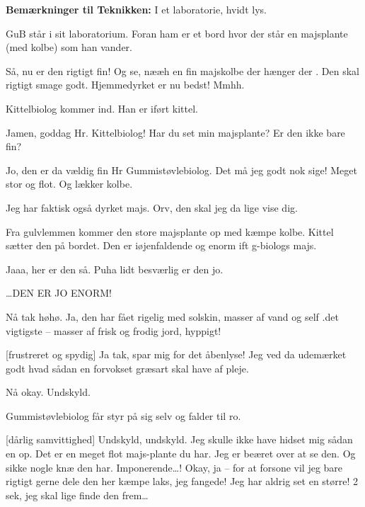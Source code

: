 \documentclass[a4paper,12pt]{article}
\begin{document}
\begin{sketch}

\textbf{Bemærkninger til Teknikken:} I et laboratorie, hvidt lys.





\scene GuB står i sit laboratorium. Foran ham er et bord hvor der står en majsplante (med kolbe) som han vander.

Så, nu er den rigtigt fin! Og se, nææh en fin majskolbe der hænger der . Den skal rigtigt smage godt. Hjemmedyrket er nu bedst! Mmhh.


\scene Kittelbiolog kommer ind. Han er iført kittel.

Jamen, goddag Hr. Kittelbiolog! Har du set min majsplante? Er den ikke bare fin?

Jo, den er da vældig fin Hr Gummistøvlebiolog. Det må jeg godt nok sige! Meget stor og flot. Og lækker kolbe.


Jeg har faktisk også dyrket majs. Orv, den skal jeg da lige vise dig.

\scene Fra gulvlemmen kommer den store majsplante op med kæmpe kolbe. Kittel sætter den på bordet. Den er iøjenfaldende og enorm ift g-biologs majs.

Jaaa, her er den så. Puha lidt besværlig er den jo.

\ldots DEN ER JO ENORM!


Nå tak høhø. Ja, den har fået rigelig med solskin, masser af vand og self .det vigtigste – masser af frisk og frodig jord, hyppigt!

[frustreret og spydig] Ja tak, spar mig for det åbenlyse! Jeg ved da udemærket godt hvad sådan en forvokset græsart skal have af pleje. 

Nå okay. Undskyld.

\scene Gummistøvlebiolog får styr på sig selv og falder til ro.

[dårlig samvittighed] Undskyld, undskyld. Jeg skulle ikke have hidset mig sådan en op. Det er en meget flot majs-plante du har. Jeg er beæret over at se den. Og sikke nogle knæ den har. Imponerende…! Okay, ja – for at forsone vil jeg bare rigtigt gerne dele den her kæmpe laks, jeg fangede! Jeg har aldrig set en større!  2 sek, jeg skal lige finde den frem\ldots 


\end{sketch}
\end{document}
